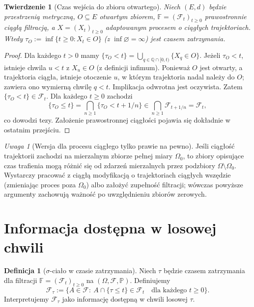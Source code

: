 \documentclass[11pt,a4paper,oneside]{report}
\numberwithin{equation}{chapter}
\theoremstyle{plain}
\newtheorem{twierdzenie}{Twierdzenie}[chapter]
\theoremstyle{definition}
\newtheorem{definicja}{Definicja}[chapter]
\theoremstyle{remark}
\newtheorem{uwaga}{Uwaga}[chapter]
\newcommand{\Q}{\mathbb{Q}}
\newcommand{\Prob}{\mathbb{P}}
\newcommand{\calF}{\mathcal{F}}
\begin{document}
\begin{twierdzenie}[Czas wejścia do zbioru otwartego]
Niech $(E,d)$ będzie przestrzenią metryczną,
$O\subseteq E$ otwartym zbiorem,
$\mathbb F=(\calF_t)_{t\ge0}$ prawostronnie ciągłą filtracją,
a $X=(X_t)_{t\ge0}$ adaptowanym procesem o ciągłych
trajektoriach. Wtedy
$\tau_O:=\inf\{t\ge0:X_t\in O\}$ (z $\inf\varnothing=\infty$)
jest czasem zatrzymania.
\end{twierdzenie}
\begin{proof}
Dla każdego $t>0$ mamy
$\{\tau_O<t\}=\bigcup_{q\in\Q\cap[0,t)}\{X_q\in O\}$.
Jeżeli $\tau_O<t$, istnieje chwila $u<t$ z $X_u\in O$
(z definicji infimum). Ponieważ $O$ jest otwarty,
a trajektoria ciągła, istnieje otoczenie $u$,
w którym trajektoria nadal należy do $O$; zawiera
ono wymierną chwilę $q<t$. Implikacja odwrotna
jest oczywista. Zatem $\{\tau_O<t\}\in\calF_t$.
Dla każdego $t\ge0$ zachodzi
\[
\{\tau_O\le t\}=\bigcap_{n\ge1}\{\tau_O<t+1/n\}
\in\bigcap_{n\ge1}\calF_{t+1/n}=\calF_t,
\]
co dowodzi tezy. Założenie prawostronnej ciągłości
pojawia się dokładnie w ostatnim przejściu.
\end{proof}

\begin{uwaga}[Wersja dla procesu ciągłego tylko prawie na pewno]
Jeśli ciągłość trajektorii zachodzi na mierzalnym
zbiorze pełnej miary $\Omega_0$, to zbiory opisujące
czas trafienia mogą różnić się od zdarzeń mierzalnych
przez podzbiory $\Omega\setminus\Omega_0$. Wystarczy
pracować z ciągłą modyfikacją o trajektoriach ciągłych
wszędzie (zmieniając proces poza $\Omega_0$) albo
założyć zupełność filtracji; wówczas powyższe
argumenty zachowują ważność po uwzględnieniu
zbiorów zerowych.
\end{uwaga}

\section{Informacja dostępna w losowej chwili}
\begin{definicja}[$\sigma$-ciało w czasie zatrzymania]
Niech $\tau$ będzie czasem zatrzymania dla filtracji
$\mathbb F=(\calF_t)_{t\ge0}$ na $(\Omega,\calF,\Prob)$.
Definiujemy
\[
\calF_\tau:=\big\{A\in\calF:\ 
A\cap\{\tau\le t\}\in\calF_t\quad
\text{dla każdego }t\ge0\big\}.
\]
Interpretujemy $\calF_\tau$ jako informację dostępną
w chwili losowej $\tau$.
\end{definicja}
\end{document}

